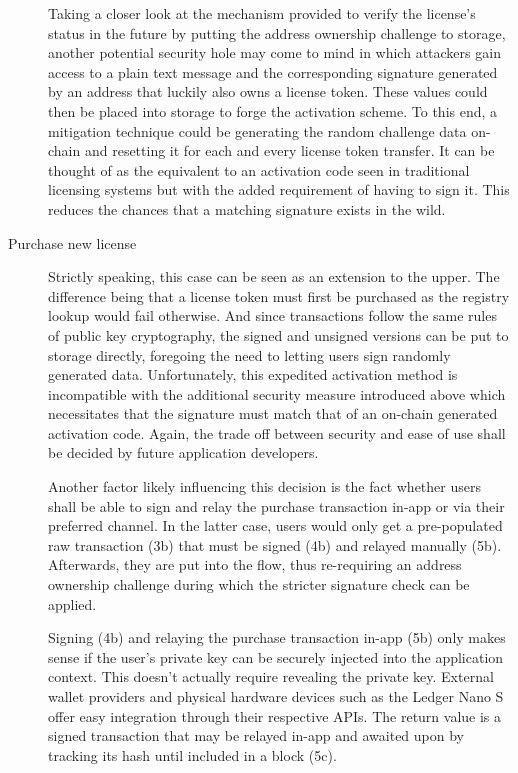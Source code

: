 \documentclass{egpubl}
\begin{document}
\begin{description}
	Taking a closer look at the mechanism provided to verify the license's status in the future by putting the address ownership challenge to storage, another potential security hole may come to mind in which attackers gain access to a plain text message and the corresponding signature generated by an address that luckily also owns a license token. These values could then be placed into storage to forge the activation scheme. To this end, a mitigation technique could be generating the random challenge data on-chain and resetting it for each and every license token transfer. It can be thought of as the equivalent to an activation code seen in traditional licensing systems but with the added requirement of having to sign it. This reduces the chances that a matching signature exists in the wild.
	\hfill \\
	\item[Purchase new license \label{itm:purchaseFlow}]
	Strictly speaking, this case can be seen as an extension to the upper. The difference being that a license token must first be purchased as the registry lookup would fail otherwise. And since transactions follow the same rules of public key cryptography, the signed and unsigned versions can be put to storage directly, foregoing the need to letting users sign randomly generated data. Unfortunately, this expedited activation method is incompatible with the additional security measure introduced above which necessitates that the signature must match that of an on-chain generated activation code. Again, the trade off between security and ease of use shall be decided by future application developers. 
	
	Another factor likely influencing this decision is the fact whether users shall be able to sign and relay the purchase transaction in-app or via their preferred channel. In the latter case, users would only get a pre-populated raw transaction (3b) that must be signed (4b) and relayed manually (5b). Afterwards, they are put into the \textit{} flow, thus re-requiring an address ownership challenge during which the stricter signature check can be applied. 
	
	Signing (4b) and relaying the purchase transaction in-app (5b) only makes sense if the user's private key can be securely injected into the application context. This doesn't actually require revealing the private key. External wallet providers and physical hardware devices such as the Ledger Nano S offer easy integration through their respective APIs. The return value is a signed transaction that may be relayed in-app and awaited upon by tracking its hash until included in a block (5c).
	\hfill \\
\end{description}
\end{document}
